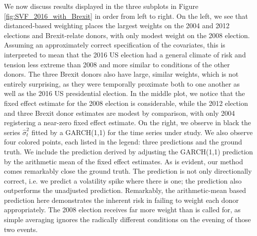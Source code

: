 \documentclass[11pt,3p,review,authoryear]{elsarticle}
\theoremstyle{definition}
\begin{document}
We now discuss results displayed in the three subplots in Figure \ref{fig:SVF_2016_with_Brexit} in order from left to right. On the left, we see that distanced-based weighting places the largest weights on the 2004 and 2012 elections and Brexit-relate donors, with only modest weight on the 2008 election. Assuming an approximately correct specification of the covariates, this is interpreted to mean that the 2016 US election had a general climate of risk and tension less extreme than 2008 and more similar to conditions of the other donors.  The three Brexit donors also have large, similar weights, which is not entirely surprising, as they were temporally proximate both to one another as well as the 2016 US presidential election.  In the middle plot, we notice that the fixed effect estimate for the 2008 election is considerable, while the 2012 election and three Brexit  donor estimates are modest by comparison, with only 2004 registering a near-zero fixed effect estimate. On the right, we observe in black the series $\hat\sigma^{2}_{t}$ fitted by a GARCH(1,1) for the time series under study.  We also observe four colored points, each listed in the legend: three predictions and the ground truth.  We include the prediction derived by adjusting the GARCH(1,1) prediction by the arithmetic mean of the fixed effect estimates.  As is evident, our method comes remarkably close the ground truth.  The prediction is not only directionally correct, i.e. we predict a volatility spike where there is one; the prediction also outperforms the unadjusted prediction.  Remarkably, the arithmetic-mean based prediction here demonstrates the inherent risk in failing to weight each donor appropriately.  The 2008 election receives far more weight than is called for, as simple averaging ignores the radically different conditions on the evening of those two events.  %
\end{document}
